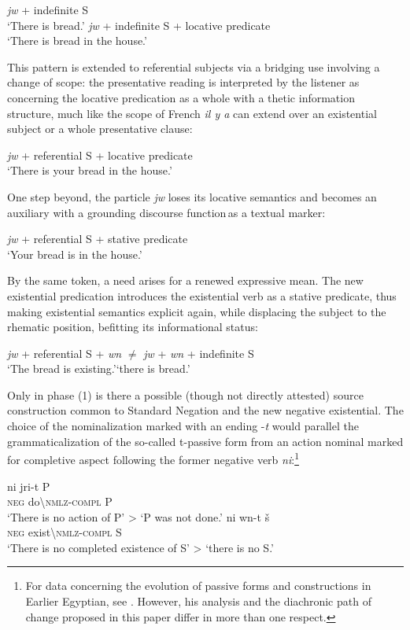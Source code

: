 \documentclass[output=paper]{langsci/langscibook}
\newcommand{\ꜥ}{ʿ}
\newcommand{\ꜣ}{\kern-.25pt\texttt{ꜣ}\kern-.6pt}
\begin{document}
\ea 
    \ea \textit{jw} + indefinite S\\ 
    \glt ‘There is bread.’ 
    \ex \textit{jw} + indefinite S + locative predicate\\
    \glt ‘There is bread in the house.’ 
\z \z 

This pattern is extended to referential subjects via a bridging use involving a change of scope: the presentative reading is interpreted by the listener as concerning the locative predication as a whole with a thetic information structure, much like the scope of French \textit{il y a} can extend over an existential subject or a whole presentative clause: 

\ea \textit{jw} + referential S + locative predicate\\  
    \glt ‘There is your bread in the house.’ 
\z

One step beyond, the particle \textit{jw} loses its locative semantics and becomes an auxiliary with a grounding discourse function as a textual marker: 
 
\ea  \textit{jw} + referential S + stative predicate\\ 
    \glt ‘Your bread is in the house.’ 
\z 

By the same token, a need arises for a renewed expressive mean. The new existential predication introduces the existential verb as a stative predicate, thus making existential semantics explicit again, while displacing the subject to the rhematic position, befitting its informational status:  
 
\ea  \textit{jw} + referential S + \textit{wn} $≠$ \textit{jw} + \textit{wn} + indefinite S\\ 
    \glt ‘The bread is existing.’‘there is bread.’ 
\z 

Only in phase (1) is there a possible (though not directly attested) source construction common to Standard Negation and the new negative existential. The choice of the nominalization marked with an ending -\textit{t} would parallel the grammaticalization of the so-called t-passive form from an action nominal marked for completive aspect following the former negative verb \textit{ni}:\footnote{For data concerning the evolution of passive forms and constructions in Earlier Egyptian, see \citet{Stauder2014b}. However, his analysis and the diachronic path of change proposed in this paper differ in more than one respect.}

\ea 
    \ea 
    \gll ni jri-t P\\ 
    \textsc{neg} do\textbackslash\textsc{nmlz-compl} P\\ 
    \glt ‘There is no action of P’ > ‘P was not done.’ 
    \ex 
    \gll ni wn-t š\\
    \textsc{neg} exist\textbackslash\textsc{nmlz-compl} S\\
    \glt ‘There is no completed existence of S’ > ‘there is no S.’ 
\z \z 
\end{document}
